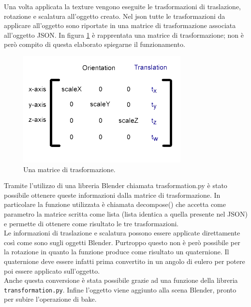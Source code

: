 Una volta applicata la texture vengono eseguite le trasformazioni di traslazione, rotazione e scalatura all’oggetto creato.
Nel json tutte le trasformazioni da applicare all’oggetto sono riportate in una matrice di trasformazione associata all’oggetto JSON. In figura \ref{fig:baking_service_matrix} è rapprentata una matrice di trasformazione; non è però compito di questa elaborato spiegarne il funzionamento.
\\
\begin{figure}[htb]
 \centering
 \includegraphics[width=0.6\linewidth]{images/chapter_baking_service/matrix.jpg}\hfill
 \caption[Matrice di trasformazione]{Una matrice di trasformazione.}
 \label{fig:baking_service_matrix}
\end{figure}

Tramite l’utilizzo di una libreria Blender chiamata trasformation.py è stato possibile ottenere queste informazioni dalla matrice di trasformazione. 
In particolare la funzione utilizzata è chiamata decompose() che accetta come parametro la matrice scritta come lista (lista identica a quella presente nel JSON) e permette di ottenere come risultato le tre trasformazioni.
\\
Le informazioni di traslazione e scalatura possono essere applicate direttamente così come sono sugli oggetti Blender. 
Purtroppo questo non è però possibile per la rotazione in quanto la funzione produce come risultato un quaternione. Il quaternione deve essere infatti prima convertito in un angolo di eulero per potere poi essere applicato sull’oggetto. 
\\
Anche questa conversione è stata possibile grazie ad una funzione della libreria \texttt{transformation.py}.
Infine l’oggetto viene aggiunto alla scena Blender, pronto per subire l’operazione di bake.

